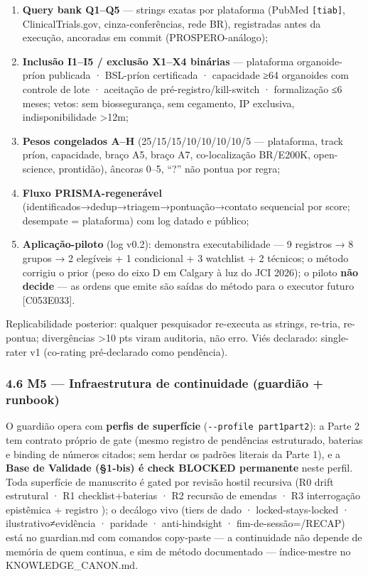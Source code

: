 \documentclass[
  10pt,
]{article}
\providecommand{\tightlist}{%
  \setlength{\itemsep}{0pt}\setlength{\parskip}{0pt}}
\begin{document}
\begin{enumerate}
\def\labelenumi{\arabic{enumi}.}
\tightlist
\item
  \textbf{Query bank Q1--Q5} --- strings exatas por plataforma (PubMed
  \texttt{{[}tiab{]}}, ClinicalTrials.gov, cinza-conferências, rede BR),
  registradas antes da execução, ancoradas em commit (PROSPERO-análogo);
\item
  \textbf{Inclusão I1--I5 / exclusão X1--X4 binárias} --- plataforma
  organoide-príon publicada · BSL-príon certificada · capacidade ≥64
  organoides com controle de lote · aceitação de
  pré-registro/kill-switch · formalização ≤6 meses; vetos: sem
  biossegurança, sem cegamento, IP exclusiva, indisponibilidade
  \textgreater12m;
\item
  \textbf{Pesos congelados A--H} (25/15/15/10/10/10/10/5 --- plataforma,
  track príon, capacidade, braço A5, braço A7, co-localização BR/E200K,
  open-science, prontidão), âncoras 0--5, ``?'' não pontua por regra;
\item
  \textbf{Fluxo PRISMA-regenerável}
  (identificados→dedup→triagem→pontuação→contato sequencial por score;
  desempate = plataforma) com log datado e público;
\item
  \textbf{Aplicação-piloto} (log v0.2): demonstra executabilidade --- 9
  registros → 8 grupos → 2 elegíveis + 1 condicional + 3 watchlist + 2
  técnicos; o método corrigiu o prior (peso do eixo D em Calgary à luz
  do JCI 2026); o piloto \textbf{não decide} --- as ordens que emite são
  saídas do método para o executor futuro {[}C053\textbar E033{]}.
\end{enumerate}

Replicabilidade posterior: qualquer pesquisador re-executa as strings,
re-tria, re-pontua; divergências \textgreater10 pts viram auditoria, não
erro. Viés declarado: single-rater v1 (co-rating pré-declarado como
pendência).

\hypertarget{m5-infraestrutura-de-continuidade-guardiuxe3o-runbook}{%
\subsubsection{4.6 M5 --- Infraestrutura de continuidade (guardião +
runbook)}\label{m5-infraestrutura-de-continuidade-guardiuxe3o-runbook}}

O guardião opera com \textbf{perfis de superfície}
(\texttt{-\/-profile\ part1\textbar{}part2}): a Parte 2 tem contrato
próprio de gate (mesmo registro de pendências estruturado, baterias e
binding de números citados; sem herdar os padrões literais da Parte 1),
e a \textbf{Base de Validade (§1-bis) é check BLOCKED permanente} neste
perfil. Toda superfície de manuscrito é gated por revisão hostil
recursiva (R0 drift estrutural · R1 checklist+baterias · R2 recursão de
emendas · R3 interrogação epistêmica + registro ); o decálogo vivo
(tiers de dado · locked-stays-locked · ilustrativo≠evidência · paridade
· anti-hindsight · fim-de-sessão=/RECAP) está no guardian.md com
comandos copy-paste --- a continuidade não depende de memória de quem
continua, e sim de método documentado --- índice-mestre no
KNOWLEDGE\_CANON.md.
\end{document}
